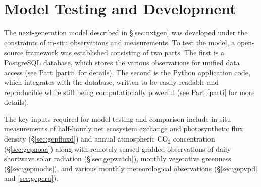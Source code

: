 \section{Model Testing and Development}
\label{sec:modeldev}
The next-generation model described in \S \ref{sec:nxtgen} was developed under the constraints of in-situ observations and measurements. 
To test the model, a open-source framework was established consisting of two parts.
The first is a PostgreSQL database, which stores the various observations for unified data access (see Part \ref{partii} for details).
The second is the Python application code, which integrates with the database, written to be easily readable and reproducible while still being computationally powerful (see Part \ref{parti} for more details).

The key inputs required for model testing and comparison include in-situ measurements of half-hourly net ecosystem exchange and photosynthetic flux density (\S \ref{sec:gepfluxd}) and annual atmospheric CO$_2$ concentration (\S \ref{sec:gepnoaa}) along with remotely sensed gridded observations of daily shortwave solar radiation (\S \ref{sec:gepwatch}), monthly vegetative greenness (\S \ref{sec:gepmodis}), and various monthly meteorological observations (\S \ref{sec:gepvpd} and \ref{sec:gepcru}).

